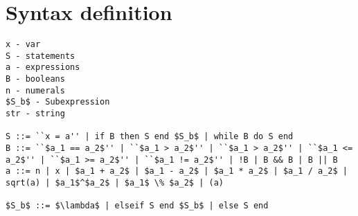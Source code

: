 \section{Syntax definition}\label{sec::anlysis::syntax-definition}
\begin{lstlisting}[mathescape]
x - var
S - statements
a - expressions
B - booleans
n - numerals
$S_b$ - Subexpression
str - string

S ::= ``x = a'' | if B then S end $S_b$ | while B do S end
B ::= ``$a_1 == a_2$'' | ``$a_1 > a_2$'' | ``$a_1 > a_2$'' | ``$a_1 <= a_2$'' | ``$a_1 >= a_2$'' | ``$a_1 != a_2$'' | !B | B && B | B || B
a ::= n | x | $a_1 + a_2$ | $a_1 - a_2$ | $a_1 * a_2$ | $a_1 / a_2$ | sqrt(a) | $a_1$^$a_2$ | $a_1$ \% $a_2$ | (a)

$S_b$ ::= $\lambda$ | elseif S end $S_b$ | else S end
\end{lstlisting}



